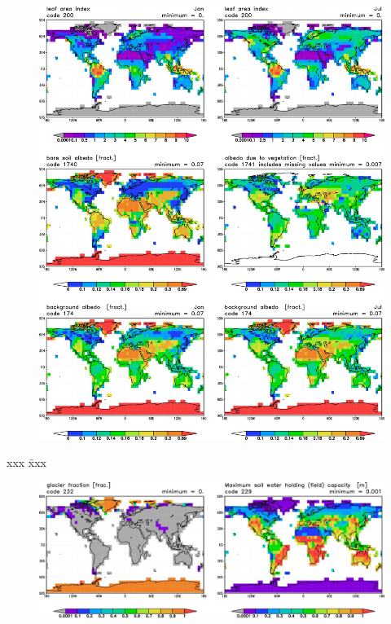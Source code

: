 \begin{figure}[ht] \bc
\includegraphics{silke/surface_fields_for_UG_6pic_alb}
\ec \end{figure}

\clearpage
\vspace{100.ex}
\begin{tabbing}
xxx \= xxx \kill
\end{tabbing}

\begin{figure}[ht] 
\includegraphics{silke/surface_fields_for_UG_2pic}
\end{figure}

